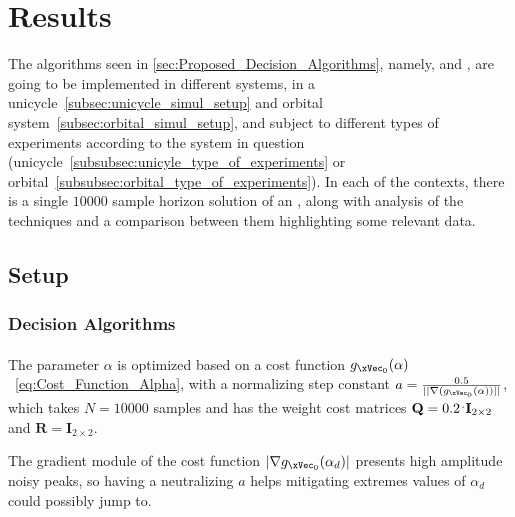 
%


\chapter{Results}
\label{cha:results}

The algorithms seen in \ref{sec:Proposed_Decision_Algorithms}, namely, \label{subsec:decision_algorithms}  and ,  are going to be implemented in different systems, in a unicycle~\ref{subsec:unicycle_simul_setup} and orbital system~\ref{subsec:orbital_simul_setup}, and subject to different types of experiments according to the system in question (unicycle~\ref{subsubsec:unicyle_type_of_experiments} or orbital~\ref{subsubsec:orbital_type_of_experiments}). In each of the contexts, there is a single \(10000\) sample horizon solution of an , along with analysis of the techniques and a comparison  between them highlighting  some relevant data.

\section{Setup}
\label{sec:setup}

\subsection{Decision Algorithms}
\label{subsec:decision_algorithms}

\subsubsection{}
\label{subsubsec:A-JO_parameters}

The parameter \(\alpha\) is optimized based on a cost function \(g_{\xVec_0}(\alpha)\)~\ref{eq:Cost_Function_Alpha}, with a normalizing step constant \(a = \frac{0.5}{||\nabla(g_{\xVec_0}(\alpha))||}\), which takes \(N=10000\) samples and has the weight cost matrices \(\mathbf{Q} = 0.2\hspace{0.1em}^.\mathbf{I}_{2\times 2} \) and \(\mathbf{R} = \mathbf{I}_{2\times 2} \).\par  
The gradient module of the cost function \(|\nabla g_{\xVec_0}(\alpha_d)|\) presents high amplitude noisy peaks, so having a neutralizing \(a\) helps mitigating extremes values of \(\alpha_d\) could possibly jump to.\\

